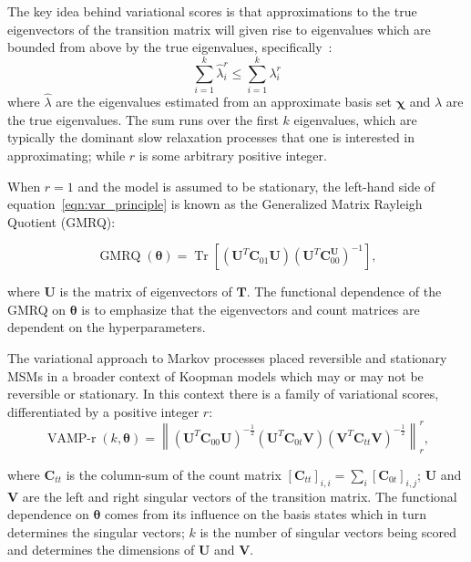 \documentclass[journal=jacsat,manuscript=article]{achemso}
\begin{document}
The key idea behind variational scores is that  approximations to the true eigenvectors of the transition matrix will given rise to eigenvalues which are bounded from above by the true eigenvalues, specifically~\cite{mcgibbonVariationalCrossvalidationSlow2015, wuVariationalApproachLearning2020c}: 
\begin{equation}\label{eqn:var_principle}
    \sum_{i=1}^{k}\hat{\lambda}_{i}^{r} \leq \sum_{i=1}^{k}\lambda_{i}^{r}
\end{equation}
where $\hat{\lambda}$ are the eigenvalues estimated from an approximate basis set $\bm{\chi}$ and $\lambda$ are the true eigenvalues. The sum runs over the first $k$ eigenvalues, which are typically the dominant slow relaxation processes that one is interested in approximating; while $r$ is some arbitrary positive integer\cite{wuVariationalApproachLearning2020c}.

When $r=1$ and the model is assumed to be stationary\cite{mcgibbonVariationalCrossvalidationSlow2015}, the left-hand side of equation~\ref{eqn:var_principle} is known as the Generalized Matrix Rayleigh Quotient (GMRQ):

\begin{equation}
    \operatorname{GMRQ}(\bm{\theta}) = \operatorname{Tr}\left[(\mathbf{U}^{T}\mathbf{C}_{01}\mathbf{U})(\mathbf{U}^{T}\mathbf{C}_{00}^\mathbf{U})^{-1}\right], \label{eqn:gmrq_def}
\end{equation}

where $\mathbf{U}$ is the matrix of eigenvectors of $\mathbf{T}$. The functional dependence of the GMRQ on $\bm{\theta}$ is to emphasize that the eigenvectors and count matrices are dependent on the hyperparameters. 

The variational approach to Markov processes placed reversible and stationary MSMs in a broader context of Koopman models which may or may not be reversible or stationary.  In this context there is a family of variational scores, differentiated by a positive integer $r$: 
\begin{equation}
     \operatorname{VAMP-r}(k, \bm{\theta}) = \left \| (\mathbf{U}^{T}\mathbf{C}_{00}\mathbf{U})^{-\frac{1}{2}}(\mathbf{U}^{T}\mathbf{C}_{0t}\mathbf{V})(\mathbf{V}^{T}\mathbf{C}_{tt}\mathbf{V})^{-\frac{1}{2}} \right \|_{r}^{r}, \label{eqn:vamp_def}
\end{equation}

where $\mathbf{C}_{tt}$ is the column-sum of the count matrix $[\mathbf{C}_{tt}]_{i, i} = \sum_i [\mathbf{C}_{0t}]_{i, j}$; $\mathbf{U}$ and $\mathbf{V}$ are the left and right singular vectors of the transition matrix. The functional dependence on $\bm{\theta}$ comes from its influence on the basis states which in turn determines the singular vectors; $k$ is the number of singular vectors being scored and determines the dimensions of $\mathbf{U}$ and $\mathbf{V}$.  
\end{document}
